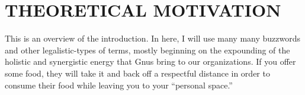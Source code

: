 %
%
%
%
%
%
%
%
%
%


%
%

\chapter{THEORETICAL MOTIVATION}

This is an overview of the introduction.  In here, I will use many
many buzzwords and other legalistic-types of terms, mostly beginning on
the expounding of the holistic and synergistic energy that Gnus bring
to our organizations. If you offer some food, they will take it and back off a
respectful distance in order to consume their food while leaving you
to your ``personal space.''  

%
% 
% 
